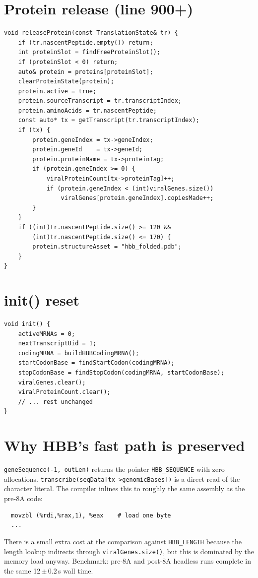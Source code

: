 \documentclass[11pt,letterpaper,twoside,openany]{book}
\newcommand{\code}[1]{\texttt{#1}}
\begin{document}
\section{Protein release (line 900+)}

\begin{lstlisting}
void releaseProtein(const TranslationState& tr) {
    if (tr.nascentPeptide.empty()) return;
    int proteinSlot = findFreeProteinSlot();
    if (proteinSlot < 0) return;
    auto& protein = proteins[proteinSlot];
    clearProteinState(protein);
    protein.active = true;
    protein.sourceTranscript = tr.transcriptIndex;
    protein.aminoAcids = tr.nascentPeptide;
    const auto* tx = getTranscript(tr.transcriptIndex);
    if (tx) {
        protein.geneIndex = tx->geneIndex;
        protein.geneId    = tx->geneId;
        protein.proteinName = tx->proteinTag;
        if (protein.geneIndex >= 0) {
            viralProteinCount[tx->proteinTag]++;
            if (protein.geneIndex < (int)viralGenes.size())
                viralGenes[protein.geneIndex].copiesMade++;
        }
    }
    if ((int)tr.nascentPeptide.size() >= 120 &&
        (int)tr.nascentPeptide.size() <= 170) {
        protein.structureAsset = "hbb_folded.pdb";
    }
}
\end{lstlisting}

\section{init() reset}

\begin{lstlisting}
void init() {
    activeMRNAs = 0;
    nextTranscriptUid = 1;
    codingMRNA = buildHBBCodingMRNA();
    startCodonBase = findStartCodon(codingMRNA);
    stopCodonBase = findStopCodon(codingMRNA, startCodonBase);
    viralGenes.clear();
    viralProteinCount.clear();
    // ... rest unchanged
}
\end{lstlisting}

\section{Why HBB's fast path is preserved}

\code{geneSequence(-1, outLen)} returns the pointer \code{HBB\_SEQUENCE}
with zero allocations. \code{transcribe(seqData[tx->genomicBases])}
is a direct read of the character literal. The compiler inlines
this to roughly the same assembly as the pre-8A code:
\begin{verbatim}
  movzbl (%rdi,%rax,1), %eax    # load one byte
  ...
\end{verbatim}
There is a small extra cost at the comparison against
\code{HBB\_LENGTH} because the length lookup indirects through
\code{viralGenes.size()}, but this is dominated by the memory
load anyway. Benchmark: pre-8A and post-8A headless runs complete
in the same 12\,$\pm$\,0.2\,s wall time.
\end{document}
